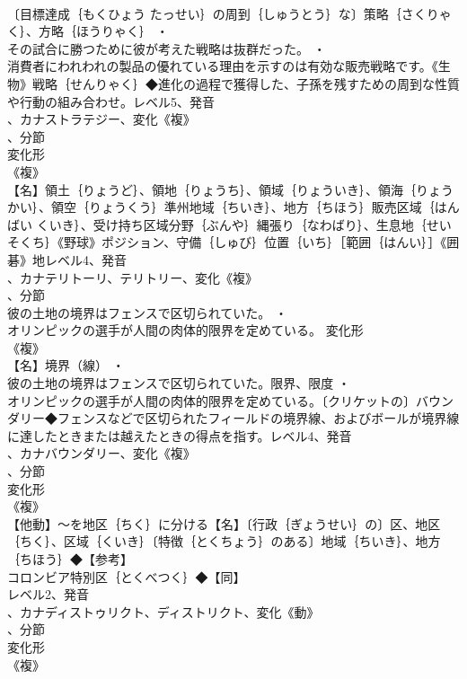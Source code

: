 \documentclass[8pt]{extreport}
\begin{document}
\begin{CJK}{UTF8}{min}
\\	〔目標達成｛もくひょう たっせい｝の周到｛しゅうとう｝な〕策略｛さくりゃく｝、方略｛ほうりゃく｝ ・
\\	その試合に勝つために彼が考えた戦略は抜群だった。 ・
\\	消費者にわれわれの製品の優れている理由を示すのは有効な販売戦略です。《生物》戦略｛せんりゃく｝◆進化の過程で獲得した、子孫を残すための周到な性質や行動の組み合わせ。レベル5、発音
\\	、カナストラテジー、変化《複》
\\	、分節
\\	変化形 
\\	《複》
\\	【名】領土｛りょうど｝、領地｛りょうち｝、領域｛りょういき｝、領海｛りょうかい｝、領空｛りょうくう｝準州地域｛ちいき｝、地方｛ちほう｝販売区域｛はんばい くいき｝、受け持ち区域分野｛ぶんや｝縄張り｛なわばり｝、生息地｛せいそくち｝《野球》ポジション、守備｛しゅび｝位置｛いち｝［範囲｛はんい｝］《囲碁》地レベル4、発音
\\	、カナテリトーリ、テリトリー、変化《複》
\\	、分節
\\	彼の土地の境界はフェンスで区切られていた。 ・
\\	オリンピックの選手が人間の肉体的限界を定めている。	変化形 
\\	《複》
\\	【名】境界（線） ・
\\	彼の土地の境界はフェンスで区切られていた。限界、限度 ・
\\	オリンピックの選手が人間の肉体的限界を定めている。〔クリケットの〕バウンダリー◆フェンスなどで区切られたフィールドの境界線、およびボールが境界線に達したときまたは越えたときの得点を指す。レベル4、発音
\\	、カナバウンダリー、変化《複》
\\	、分節
\\	変化形 
\\	《複》
\\	【他動】～を地区｛ちく｝に分ける【名】〔行政｛ぎょうせい｝の〕区、地区｛ちく｝、区域｛くいき｝〔特徴｛とくちょう｝のある〕地域｛ちいき｝、地方｛ちほう｝◆【参考】
\\	コロンビア特別区｛とくべつく｝◆【同】
\\	レベル2、発音
\\	、カナディストゥリクト、ディストリクト、変化《動》
\\	、分節
\\	変化形 
\\	《複》

\end{CJK}
\end{document}
